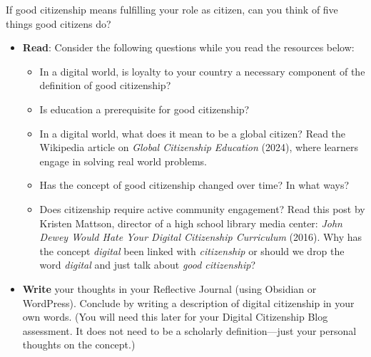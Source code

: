 \documentclass[
  letterpaper,
  DIV=11,
  numbers=noendperiod]{scrreprt}
\providecommand{\tightlist}{%
  \setlength{\itemsep}{0pt}\setlength{\parskip}{0pt}}\usepackage{longtable,booktabs,array}
\begin{document}
\begin{tcolorbox}[enhanced jigsaw, toprule=.15mm, colback=white, colframe=quarto-callout-note-color-frame, bottomtitle=1mm, leftrule=.75mm, coltitle=black, titlerule=0mm, rightrule=.15mm, colbacktitle=quarto-callout-note-color!10!white, left=2mm, title={Learning Activity}, opacitybacktitle=0.6, opacityback=0, breakable, toptitle=1mm, arc=.35mm, bottomrule=.15mm]

If good citizenship means fulfilling your role as citizen, can you think
of five things good citizens do?

\begin{itemize}
\tightlist
\item
  \textbf{Read}: Consider the following questions while you read the
  resources below:

  \begin{itemize}
  \tightlist
  \item
    In a digital world, is loyalty to your country a necessary component
    of the definition of good citizenship?
  \item
    Is education a prerequisite for good citizenship?
  \item
    In a digital world, what does it mean to be a global citizen? Read
    the Wikipedia article on \emph{Global Citizenship Education} (2024),
    where learners engage in solving real world problems.
  \item
    Has the concept of good citizenship changed over time? In what ways?
  \item
    Does citizenship require active community engagement? Read this post
    by Kristen Mattson, director of a high school library media center:
    \emph{John Dewey Would Hate Your Digital Citizenship Curriculum}
    (2016). Why has the concept \emph{digital} been linked with
    \emph{citizenship} or should we drop the word \emph{digital} and
    just talk about \emph{good citizenship}?
  \end{itemize}
\item
  \textbf{Write} your thoughts in your Reflective Journal (using
  Obsidian or WordPress). Conclude by writing a description of digital
  citizenship in your own words. (You will need this later for your
  Digital Citizenship Blog assessment. It does not need to be a
  scholarly definition---just your personal thoughts on the concept.)
\end{itemize}

\end{tcolorbox}
\end{document}
